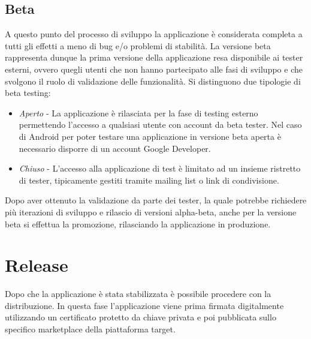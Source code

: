 \subsection{Beta}
A questo punto del processo di sviluppo la applicazione è considerata completa a tutti gli effetti a meno di bug e/o problemi di stabilità. La versione beta rappresenta dunque la prima versione della applicazione resa disponibile ai tester esterni, ovvero quegli utenti che non hanno partecipato alle fasi di sviluppo e che svolgono il ruolo di validazione delle funzionalità. Si distinguono due tipologie di beta testing:
\begin{itemize}
    \item \textit{Aperto} - La applicazione è rilasciata per la fase di testing esterno permettendo l'accesso a qualsiasi utente con account da beta tester. Nel caso di Android per poter testare una applicazione in versione beta aperta è necessario disporre di un account Google Developer.
    \item \textit{Chiuso} - L'accesso alla applicazione di test è limitato ad un insieme ristretto di tester, tipicamente gestiti tramite mailing list o link di condivisione.
\end{itemize}
Dopo aver ottenuto la validazione da parte dei tester, la quale potrebbe richiedere più iterazioni di sviluppo e rilascio di versioni alpha-beta, anche per la versione beta si effettua la promozione, rilasciando la applicazione in produzione.


\section{Release}
Dopo che la applicazione è stata stabilizzata è possibile procedere con la distribuzione. In questa fase l'applicazione viene prima firmata digitalmente utilizzando un certificato protetto da chiave privata e poi pubblicata sullo specifico marketplace della piattaforma target.


